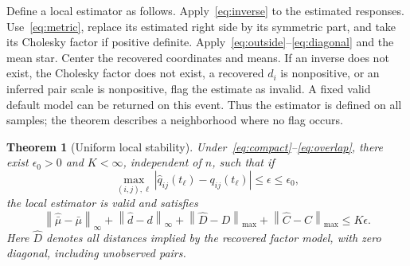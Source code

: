 \documentclass[11pt]{amsart}
\newtheorem{theorem}{Theorem}[section]
\theoremstyle{definition}\newtheorem{example}[theorem]{Example}
\theoremstyle{remark}\newtheorem{remark}[theorem]{Remark}
\newcommand{\norm}[1]{\left\lVert#1\right\rVert}
\begin{document}
Define a local estimator as follows. Apply~\eqref{eq:inverse} to the estimated responses. Use~\eqref{eq:metric}, replace its estimated right side by its symmetric part, and take its Cholesky factor if positive definite. Apply~\eqref{eq:outside}--\eqref{eq:diagonal} and the mean star. Center the recovered coordinates and means. If an inverse does not exist, the Cholesky factor does not exist, a recovered $d_i$ is nonpositive, or an inferred pair scale is nonpositive, flag the estimate as invalid. A fixed valid default model can be returned on this event. Thus the estimator is defined on all samples; the theorem describes a neighborhood where no flag occurs.

\begin{theorem}[Uniform local stability]\label{thm:stability}
Under~\eqref{eq:compact}--\eqref{eq:overlap}, there exist $\epsilon_0>0$ and $K<\infty$, independent of $n$, such that if
\[
 \max_{(i,j),\ell}|\widehat q_{ij}(t_\ell)-q_{ij}(t_\ell)|\leq\epsilon\leq\epsilon_0,
\]
the local estimator is valid and satisfies
\begin{equation}\label{eq:stable}
 \norm{\widehat{\bar\mu}-\bar\mu}_\infty
 +\norm{\widehat d-d}_\infty
 +\norm{\widehat D-D}_{\max}
 +\norm{\widehat C-C}_{\max}\leq K\epsilon.
\end{equation}
Here $\widehat D$ denotes all distances implied by the recovered factor model, with zero diagonal, including unobserved pairs.
\end{theorem}
\end{document}
